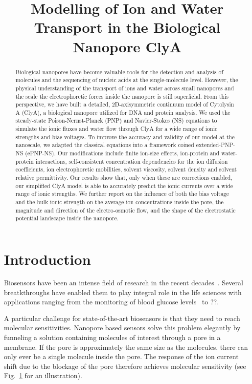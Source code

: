 \documentclass[journal=ancac3, manuscript=article, etalmode=truncate,maxauthors=0]{achemso}
\title{Modelling of Ion and Water Transport in the Biological Nanopore ClyA}
\begin{document}
\maketitle
\newpage
\begin{abstract}
Biological nanopores have become valuable tools for the detection and analysis of molecules and the sequencing of nucleic acids at the single-molecule level. However, the physical understanding of the transport of ions and water across small nanopores and the scale the electrophoretic forces inside the nanopore is still superficial. From this perspective, we have built a detailed, 2D-axisymmetric continuum model of Cytolysin A (ClyA), a biological nanopore utilized for DNA and protein analysis. We used the steady-state Poison-Nernst-Planck (PNP) and Navier-Stokes (NS) equations to simulate the ionic fluxes and water flow through ClyA for a wide range of ionic strengths and bias voltages. To improve the accuracy and validity of our model at the nanoscale, we adapted the classical equations into a framework coined extended-PNP-NS (ePNP-NS). Our modifications include finite ion-size effects, ion-protein and water-protein interactions, self-consistent concentration dependencies for the ion diffusion coefficients, ion electrophoretic mobilities, solvent viscosity, solvent density and solvent relative permittivity. Our results show that, only when these are corrections enabled, our simplified ClyA model is able to accurately predict the ionic currents over a wide range of ionic strengths. We further report on the influence of both the bias voltage and the bulk ionic strength on the average ion concentrations inside the pore, the magnitude and direction of the electro-osmotic flow, and the shape of the electrostatic potential landscape inside the nanopore.
\end{abstract}
\newpage
\section{Introduction}
Biosensors have been an intense field of research in the recent decades~\cite{zhan2015}. 
Several breatkthroughs have enabled them to play integral role in the life sciences with
applications ranging from the monitoring of blood glucose levels~\cite{chen2013} to ??. 

A particular challenge for state-of-the-art biosensors is that they need to reach molecular
sensitivities.  Nanopore based sensors solve this problem elegantly by funneling a solution
containing molecules of interest through a pore in a membrane. If the pore is approximately the
same size as the molecules, there can only ever be a single molecule inside the pore. The response
of the ion current shift due to the blockage of the pore therefore achieves molecular sensitivity
(see Fig.~\ref{} for an illustration).
\end{document}
